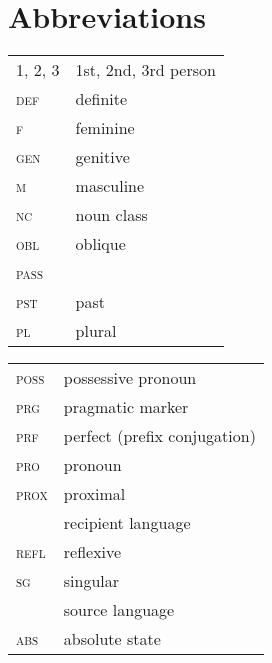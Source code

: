 \documentclass[output=paper]{langsci/langscibook}
\begin{document}
\section*{Abbreviations}

\begin{tabularx}{.5\textwidth}[t]{@{}lQ@{}}
\textsc{1, 2, 3} & 1st, 2nd, 3rd person \\
\textsc{def} & {definite}  \\
\textsc{f} & feminine \\
\textsc{gen} & genitive \\
\textsc{m} & masculine \\
\textsc{nc} & noun class  \\
\textsc{obl} & oblique \\
\textsc{pass} &  \\
\textsc{pst} & past \\
\textsc{pl} & plural \\
\end{tabularx}%
\begin{tabularx}{.5\textwidth}[t]{@{}lQ@{}}
\textsc{poss} & possessive pronoun \\
\textsc{prg} & pragmatic marker \\
\textsc{prf} & perfect (prefix conjugation) \\
\textsc{pro} & pronoun \\
\textsc{prox} & proximal \\
 & {recipient language} \\
\textsc{refl} & reflexive \\
\textsc{sg} & singular \\
 & {source language} \\
\textsc{abs} & absolute state \\
\end{tabularx}%

{\sloppy\printbibliography[heading=subbibliography,notkeyword=this]}
\end{document}
